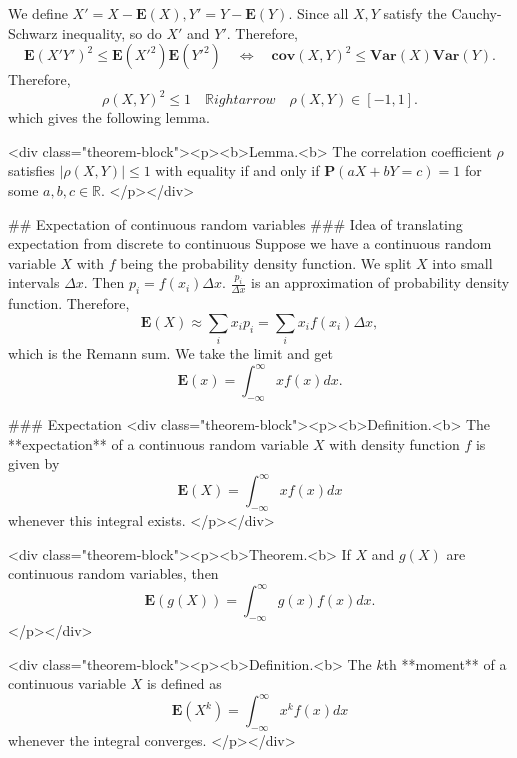 We define $X' = X-\mathbf{E}(X), Y' = Y - \mathbf{E}(Y)$. Since all $X, Y$ satisfy the Cauchy-Schwarz inequality, so do $X'$ and $Y'$. Therefore, 
$$\begin{equation}
    \mathbf{E}(X'Y')^2 \leq \mathbf{E}(X'^2) \mathbf{E}(Y'^2) \quad \Leftrightarrow \quad \mathbf{cov}(X, Y)^2 \leq \mathbf{Var}(X)\mathbf{Var}(Y).
\end{equation}$$
Therefore, 
$$\begin{equation}
    \rho(X,Y)^2 \leq 1 \quad \mathbb{R}ightarrow \quad \rho(X,Y) \in [-1, 1].
\end{equation}$$
which gives the following lemma.

<div class="theorem-block"><p><b>Lemma.<b> 
The correlation coefficient $\rho$ satisfies $\left\vert \rho (X, Y)  \right\vert \leq 1$ with equality if and only if $\mathbf{P}(aX + bY = c) = 1$ for some $a, b, c \in \mathbb{R}$. 
</p></div>


## Expectation of continuous random variables
### Idea of translating expectation from discrete to continuous
Suppose we have a continuous random variable $X$ with $f$ being the probability density function. We split $X$ into small intervals $\Delta x$. Then $p_i = f(x_i)\Delta x$. $\frac{p_i}{\Delta x}$ is an approximation of probability density function. Therefore, 
$$\begin{equation}
    \mathbf{E}(X) \approx \sum_{i} x_i p_i = \sum_{i} x_i f(x_i) \Delta x,
\end{equation}$$
which is the Remann sum. We take the limit and get
$$\begin{equation}
    \mathbf{E}(x) = \int_{-\infty}^\infty x f(x)dx.
\end{equation}$$

### Expectation
<div class="theorem-block"><p><b>Definition.<b> 
The **expectation** of a continuous random variable $X$ with density function $f$ is given by 
$$\begin{equation}
    \mathbf{E}(X) = \int_{-\infty}^\infty xf(x) dx
\end{equation}$$
whenever this integral exists.
</p></div>

<div class="theorem-block"><p><b>Theorem.<b> 
If $X$ and $g(X)$ are continuous random variables, then $$\begin{equation}
    \mathbf{E}\left( g(X) \right) = \int_{-\infty}^\infty g(x)f(x) dx.
\end{equation}$$
</p></div>

<div class="theorem-block"><p><b>Definition.<b> 
The $k$th **moment** of a continuous variable $X$ is defined as
$$\begin{equation}
    \mathbf{E}(X^k) = \int_{-\infty}^\infty x^k f(x) dx
\end{equation}$$
whenever the integral converges.
</p></div>

